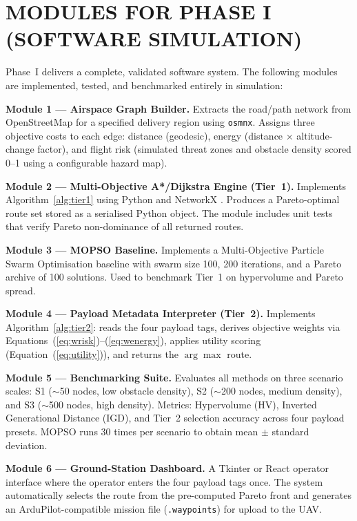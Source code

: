 \section{MODULES FOR PHASE I (SOFTWARE SIMULATION)}
\label{sec:phase1modules}

Phase~I delivers a complete, validated software system. The following modules are
implemented, tested, and benchmarked entirely in simulation:

\textbf{Module 1 --- Airspace Graph Builder.} Extracts the road/path network from
OpenStreetMap for a specified delivery region using \texttt{osmnx}. Assigns three
objective costs to each edge: distance (geodesic), energy (distance $\times$
altitude-change factor), and flight risk (simulated threat zones and obstacle density
scored 0--1 using a configurable hazard map).

\textbf{Module 2 --- Multi-Objective A*/Dijkstra Engine (Tier~1).} Implements
Algorithm~\ref{alg:tier1} using Python and NetworkX \cite{networkx}. Produces a
Pareto-optimal route set stored as a serialised Python object. The module includes unit
tests that verify Pareto non-dominance of all returned routes.

\textbf{Module 3 --- MOPSO Baseline.} Implements a Multi-Objective Particle Swarm
Optimisation baseline \cite{mopso} with swarm size 100, 200 iterations, and a Pareto
archive of 100 solutions. Used to benchmark Tier~1 on hypervolume and Pareto spread.

\textbf{Module 4 --- Payload Metadata Interpreter (Tier~2).} Implements
Algorithm~\ref{alg:tier2}: reads the four payload tags, derives objective weights via
Equations~(\ref{eq:wrisk})--(\ref{eq:wenergy}), applies utility scoring
(Equation~(\ref{eq:utility})), and returns the $\arg\max$ route.

\textbf{Module 5 --- Benchmarking Suite.} Evaluates all methods on three scenario scales:
S1 ($\sim$50 nodes, low obstacle density), S2 ($\sim$200 nodes, medium density),
and S3 ($\sim$500 nodes, high density). Metrics: Hypervolume (HV), Inverted
Generational Distance (IGD), and Tier~2 selection accuracy across four payload presets.
MOPSO runs 30 times per scenario to obtain mean $\pm$ standard deviation.

\textbf{Module 6 --- Ground-Station Dashboard.} A Tkinter or React operator interface
where the operator enters the four payload tags once. The system automatically selects
the route from the pre-computed Pareto front and generates an ArduPilot-compatible
mission file (\texttt{.waypoints}) for upload to the UAV.

